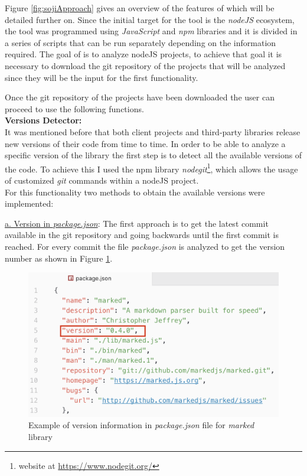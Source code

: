 Figure \ref{fig:sojiApproach} gives an overview of the features of \tool[] which will be detailed further on.
Since the initial target for the tool is the \textit{nodeJS} ecosystem, the tool was programmed using \textit{JavaScript} and \textit{npm} libraries and it is divided in a series of scripts that can be run separately depending on the information required.
The goal of \tool[] is to analyze nodeJS projects, to achieve that goal it is necessary to download the git repository of the projects that will be analyzed since they will be the input for the first functionality. 

Once the git repository of the projects have been downloaded the user can proceed to use the following functions.\\

\textbf{Versions Detector:}\\
It was mentioned before that both client projects and third-party libraries release new versions of their code from time to time. 
In order to be able to analyze a specific version of the library the first step is to detect all the available versions of the code.
To achieve this I used the npm library \textit{nodegit}\footnote{website at \url{https://www.nodegit.org/}}, which allows the usage of customized \textit{git} commands within a nodeJS project.
\\
For this functionality two methods to obtain the available versions were implemented:

\underline{a. Version in \textit{package.json}}:
The first approach is to get the latest commit available in the git repository and going backwards until the first commit is reached. 
For every commit the file \textit{package.json} is analyzed to get the version number as shown in Figure \ref{fig:pkgVerExample}. 

\begin{figure}[ht!]
\centering
\includegraphics[width=1\textwidth]{images/ver_pkg_example.png}
\caption{Example of version information in \textit{package.json} file for \textit{marked} library}
\label{fig:pkgVerExample}
\end{figure}

